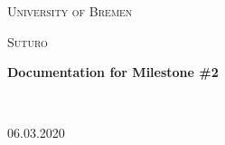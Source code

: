 \documentclass[12pt,a4paper]{report}%
\begin{document}
\begin{titlepage}

{
	\centering
	{\scshape\LARGE University of Bremen \par}
	\vspace{1cm}
	{\scshape\Large Suturo \par}
	\vspace{1.5cm}
	{\huge\bfseries Documentation for Milestone \#2 \par}
	\vspace{2cm}
	\hfill
	\\
	{06.03.2020 \par}
}

\end{titlepage}

\tableofcontents














\end{document}
